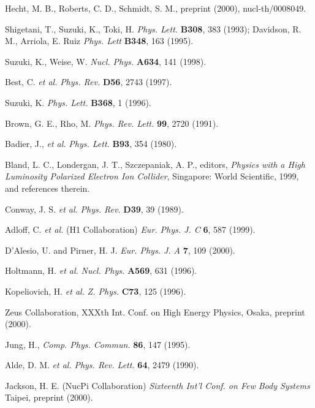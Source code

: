 \begin{references}

Hecht, M. B., Roberts, C. D., Schmidt, S. M., preprint
        (2000), nucl-th/0008049.

Shigetani, T., Suzuki, K., Toki, H. {\it Phys. Lett.}
         {\bf B308}, 383 (1993); Davidson, R. M., Arriola, E. Ruiz 
         {\it Phys. Lett} {\bf B348}, 163 (1995).

Suzuki, K., Weise, W. {\it Nucl. Phys. } {\bf A634}, 
         141 (1998).

Best, C. {\it et al.} {\it Phys. Rev. } {\bf D56}, 2743 
         (1997).

Suzuki, K. {\it Phys. Lett. } {\bf B368}, 1 (1996).

Brown, G. E., Rho, M. {\it Phys. Rev. Lett. } {\bf 99},
         2720 (1991).

Badier, J., {\it et al.} {\it Phys. Lett. } {\bf B93},
         354 (1980).

Bland, L. C., Londergan, J. T., Szczepaniak, A. P.,
         editors, {\it Physics with a High Luminosity Polarized Electron
         Ion Collider}, Singapore: World Scientific, 1999, and
         references therein.

Conway, J. S. {\it et al.} {\it Phys. Rev. } {\bf D39},
         39 (1989).

Adloff, C. {\it et al.} (H1 Collaboration) {\it Eur. 
         Phys. J. C } {\bf 6}, 587 (1999).

D'Alesio, U. and Pirner, H. J. {\it Eur. Phys. J. A }
         {\bf 7}, 109 (2000).

 Holtmann, H. {\it et al.} {\it Nucl. Phys.} 
         {\bf A569}, 631 (1996).

 Kopeliovich, H. {\it et al.} {\it Z. Phys.  } 
         {\bf C73}, 125 (1996).

 
 Zeus Collaboration, XXXth Int. Conf. on High Energy 
         Physics, Osaka, preprint (2000).

 Jung, H., {\it Comp. Phys. Commun.} {\bf 86}, 147 (1995).

 Alde, D. M. {\it et al.} {\it Phys. Rev. Lett.} {\bf 64}, 
     2479 (1990).

 Jackson, H. E. (NucPi Collaboration) {\it Sixteenth Int'l Conf.
on Few Body Systems } Taipei, preprint (2000).

\end{references}
 



